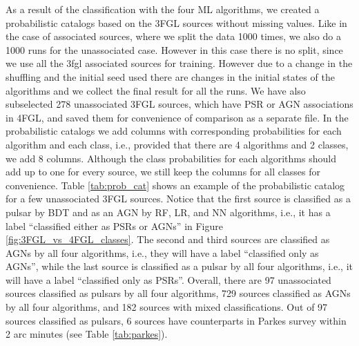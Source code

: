 As a result of the classification with the four ML algorithms,
we created a probabilistic catalogs based on the 3FGL sources without missing values. Like in the case of associated sources, where we split the data 1000 times, we also do a 1000 runs for the unassociated case. However in this case there is no split, since we use all the 3fgl associated sources for training. However due to a change in the shuffling and the initial seed used there are changes in  the initial states of the algorithms and we collect the final result for all the runs.
We have also subselected 278 unassociated 3FGL sources, which have PSR or AGN associations in 4FGL,
and saved them for convenience of comparison as a separate file.
In the probabilistic catalogs we add columns with corresponding probabilities for each algorithm and each class,
i.e., provided that there are 4 algorithms and 2 classes, we add 8 columns.
Although the class probabilities for each algorithms should add up to one for every source, we still keep the columns for all classes for convenience.
Table \ref{tab:prob_cat} shows an example of the probabilistic catalog for a few unassociated 3FGL sources.
Notice that the first source is classified as a pulsar by BDT and as an AGN by RF, LR, and NN algorithms,
i.e., it has a label ``classified either as PSRs or AGNs'' in Figure \ref{fig:3FGL_vs_4FGL_classes}.
The second and third sources are classified as AGNs by all four algorithms, i.e., they will have a label
``classified only as AGNs'',
while the last source is classified as a pulsar by all four algorithms, i.e., it will have a label
``classified only as PSRs''.
Overall, there are 97 unassociated sources classified as pulsars by all four algorithms, 729 sources classified as AGNs by all four algorithms, and 182 sources with mixed classifications.
Out of 97 sources classified as pulsars, 6 sources have counterparts in Parkes survey \cite{Camilo2015} within 2 arc minutes (see Table \ref{tab:parkes}).

